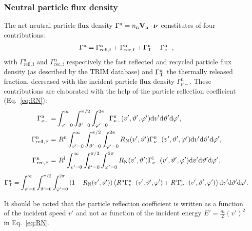 \subsubsection{Neutral particle flux density}

\noindent The net neutral particle flux density $\Gamma^{\mathrm{n}} = n_{\mathrm{n}} {\bf V}_{\mathrm{n}} \cdot {\boldsymbol \nu}_{}$ constitutes of four contributions:
\begin{equation}
\Gamma^{\mathrm{n}} =  \Gamma_{\mathrm{refl},\mathrm{f}}^{\mathrm{n}} + \Gamma_{\mathrm{rec},\mathrm{f}}^{\mathrm{n}} + \Gamma_{\mathrm{T}}^{\mathrm{n}} - \Gamma_{\nu-}^{\mathrm{n}},
\end{equation}
with $\Gamma_{\mathrm{refl},\mathrm{f}}^{\mathrm{n}}$ and $\Gamma_{\mathrm{rec},\mathrm{f}}^{\mathrm{n}}$ respectively the fast reflected and recycled particle flux density (as described by the TRIM database) and $\Gamma_{\mathrm{T}}^{\mathrm{n}}$ the thermally released fraction, decreased with the incident particle flux density $\Gamma_{\nu-}^{\mathrm{n}}$. These contributions are elaborated with the help of the particle reflection coefficient (Eq.~\eqref{eq:RN}):
\begin{align}
\Gamma_{\nu-}^{\mathrm{n}} =& \int_{v'=0}^{\infty} \int_{\vartheta'=0}^{\pi/2} \int_{\varphi'=0}^{2\pi} \Gamma_{\nu-}^{\mathrm{n}}(v',\vartheta',\varphi') \mathrm{d} v' \mathrm{d} \vartheta' \mathrm{d} \varphi', \label{eq:Gammanin} \\
\Gamma_{\mathrm{refl},\mathrm{F}}^{\mathrm{n}} =& \ R^{\mathrm{n}} \int_{v'=0}^{\infty} \int_{\vartheta'=0}^{\pi/2} \int_{\varphi'=0}^{2\pi} R_{\mathrm{N}}(v',\vartheta') \Gamma_{\nu-}^{\mathrm{n}}(v',\vartheta',\varphi') \mathrm{d} v' \mathrm{d} \vartheta' \mathrm{d} \varphi', \label{eq:Gammarefl} \\
\Gamma_{\mathrm{rec},\mathrm{F}}^{\mathrm{n}} =& \ R^{\mathrm{i}} \int_{v'=0}^{\infty} \int_{\vartheta'=0}^{\pi/2} \int_{\varphi'=0}^{2\pi} R_{\mathrm{N}}(v',\vartheta') \Gamma_{\nu-}^{\mathrm{i}}(v',\vartheta',\varphi') \mathrm{d} v' \mathrm{d} \vartheta' \mathrm{d} \varphi', \label{eq:Gammarec}
\end{align}
\begin{align}
\Gamma_{\mathrm{T}}^{\mathrm{n}} = \int_{v'=0}^{\infty} \int_{\vartheta'=0}^{\pi/2} \int_{\varphi'=0}^{2\pi} \left( 1 - R_{\mathrm{N}}(v',\vartheta') \right) \left( R^{\mathrm{n}} \Gamma_{\nu -}^{\mathrm{n}}(v',\vartheta',\varphi') + R^{\mathrm{i}} \Gamma_{\nu -}^{\mathrm{i}}(v',\vartheta',\varphi') \right) \mathrm{d} v' \mathrm{d} \vartheta' \mathrm{d} \varphi'. \label{eq:GammanT}
\end{align}

It should be noted that the particle reflection coefficient is written as a function of the incident speed $v'$ and not as function of the incident energy $E' = \frac{m}{2}(v')^{2}$ in Eq.~\eqref{eq:RN}.

